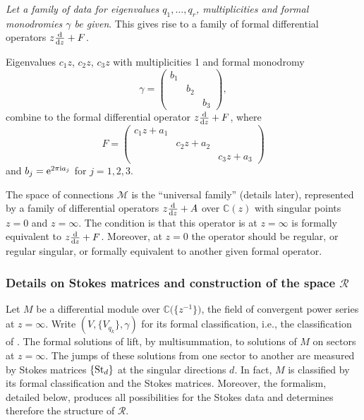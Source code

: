 \documentclass[pdftex]{sigma}
\numberwithin{equation}{section}
\begin{document}
{\it Let a family of data for eigenvalues $q_1,\dots, q_r$, multiplicities and formal monodromies $\gamma$ be given}. This gives rise to a family of formal differential operators $z\frac{{\rm d}}{{\rm d}z}+F$.

\begin{Example} Eigenvalues $c_1z$, $c_2z$, $c_3z$ with multiplicities 1 and formal monodromy
\[
\gamma=\begin{pmatrix} b_1 & & \\ & b_2 & \\ & & b_3 \end{pmatrix},
\]
 combine to
the formal differential operator $z\frac{{\rm d}}{{\rm d}z}+F$, where
\[
F=\begin{pmatrix} c_1z+ a_1 & & \\ & c_2z+a_2 & \\ & & c_3z+a_3 \end{pmatrix}
\]
and $b_j={\rm e}^{2 \pi {\rm i} a_j}$ for $j=1,2,3$.
\end{Example}

The space of connections $\mathcal{M}$ is the ``universal family'' (details later), represented by a
family of differential operators $z\frac{{\rm d}}{{\rm d}z}+A$ over $\mathbb{C}(z)$ with singular points $z=0$ and $z=\infty$.
The condition is that this operator is at $z=\infty$ is formally equivalent to $z\frac{{\rm d}}{{\rm d}z}+F$. Moreover, at $z=0$ the operator
should be regular, or regular singular, or formally equivalent to another given formal operator.

\subsubsection[Details on Stokes matrices and construction of the space R]{Details on Stokes matrices and construction of the space $\boldsymbol{\mathcal{R}}$}
Let $M$ be a differential module over $\mathbb{C}\bigl(\bigl\{ z^{-1}\bigr\}\bigr)$, the field of convergent power series at $z=\infty$.
Write $(V, \{V_{q_k}\}, \gamma)$ for its formal classification, i.e., the classification of
. The formal solutions of  lift, by multisummation, to solutions of $M$ on sectors
at $z=\infty$. The jumps of these solutions from one sector to another are measured by
Stokes matrices $\{{\rm St}_d\}$ at the singular directions $d$. In fact, $M$ is classified by its formal classification and the
Stokes matrices. Moreover, the formalism, detailed below, produces all possibilities for the Stokes data and
determines therefore the structure of $\mathcal{R}$.
\end{document}
